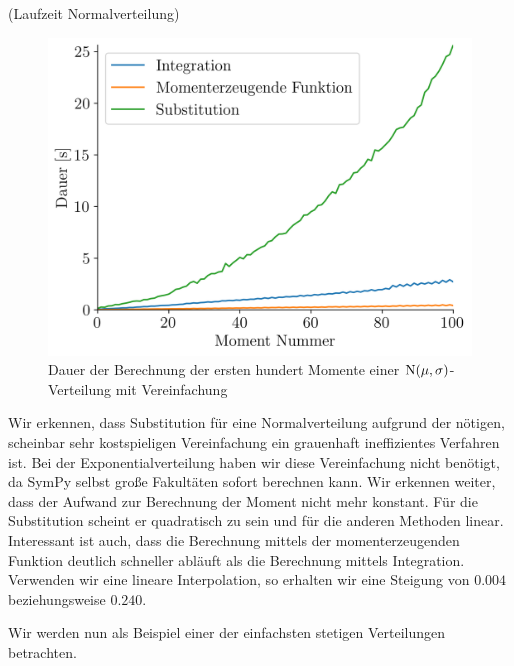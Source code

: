\begin{Beispiel}{(Laufzeit Normalverteilung)}
\begin{figure}[H]
\centering
\includegraphics[width=0.5\linewidth]{./Section/Momente/Dauer Nor.png}
\vspace*{-.3\baselineskip}
\caption{Dauer der Berechnung der ersten hundert Momente einer $\operatorname{N}(\mu, \sigma)$-Verteilung mit Vereinfachung}
\end{figure}

Wir erkennen, dass Substitution für eine Normalverteilung aufgrund der nötigen, scheinbar sehr kostspieligen Vereinfachung ein grauenhaft ineffizientes Verfahren ist. Bei der Exponentialverteilung haben wir diese Vereinfachung nicht benötigt, da SymPy selbst große Fakultäten sofort berechnen kann. Wir erkennen weiter, dass der Aufwand zur Berechnung der Moment nicht mehr konstant. Für die Substitution scheint er quadratisch zu sein und für die anderen Methoden linear. Interessant ist auch, dass die Berechnung mittels der momenterzeugenden Funktion deutlich schneller abläuft als die Berechnung mittels Integration. Verwenden wir eine lineare Interpolation, so erhalten wir eine Steigung von $0.004$ beziehungsweise $0.240$.
\end{Beispiel}

Wir werden nun als Beispiel einer der einfachsten stetigen Verteilungen betrachten.


